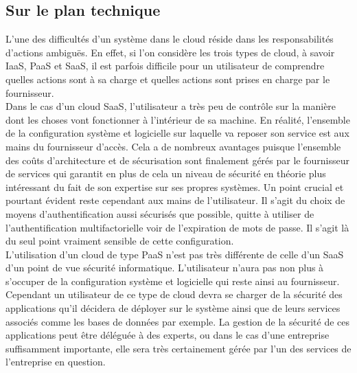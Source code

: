 \documentclass[a4paper, 12pt]{article}
\begin{document}
\begin{spacing}{1.1}
    \subsection{Sur le plan technique}
      L'une des difficultés d'un système dans le cloud réside dans les
      responsabilités d'actions ambiguës. En effet, si l'on considère les
      trois types de cloud, à savoir IaaS, PaaS et SaaS, il est parfois
      difficile pour un utilisateur de comprendre quelles actions sont à
      sa charge et quelles actions sont prises en charge par le fournisseur. \\

      Dans le cas d'un cloud SaaS, l'utilisateur a très peu de contrôle sur
      la manière dont les choses vont fonctionner à l'intérieur de sa machine.
      En réalité, l'ensemble de la configuration système et logicielle sur
      laquelle va reposer son service est aux mains du fournisseur d'accès.
      Cela a de nombreux avantages puisque l'ensemble des coûts d'architecture
      et de sécurisation sont finalement gérés par le fournisseur de services
      qui garantit en plus de cela un niveau de sécurité en théorie plus
      intéressant du fait de son expertise sur ses propres systèmes. Un point
      crucial et pourtant évident reste cependant aux mains de l'utilisateur.
      Il s'agit du choix de moyens d'authentification aussi sécurisés que
      possible, quitte à utiliser de l'authentification multifactorielle voir
      de l'expiration de mots de passe. Il s'agit là du seul point vraiment
      sensible de cette configuration. \\

      L'utilisation d'un cloud de type PaaS n'est pas très différente de
      celle d'un SaaS d'un point de vue sécurité informatique. L'utilisateur
      n'aura pas non plus à s'occuper de la configuration système et logicielle
      qui reste ainsi au fournisseur. Cependant un utilisateur de ce type de
      cloud devra se charger de la sécurité des applications qu'il décidera de
      déployer sur le système ainsi que de leurs services associés comme les
      bases de données par exemple. La gestion de la sécurité de ces
      applications peut être déléguée à des experts, ou dans le cas d'une
      entreprise suffisamment importante, elle sera très certainement gérée
      par l'un des services de l'entreprise en question. \\


\end{spacing}
\end{document}
